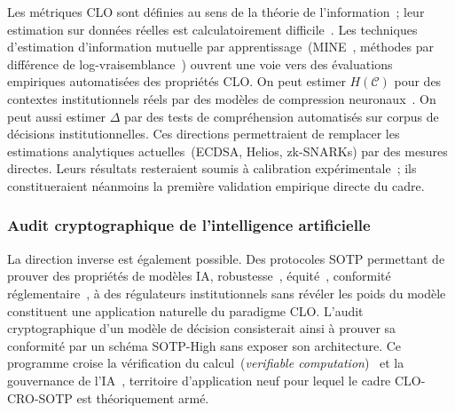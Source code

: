 \begin{sloppypar}
Les m\'etriques CLO sont d\'efinies au sens de la th\'eorie de
l'information~\cite{Shannon48,CoverThomas06}; leur estimation sur donn\'ees
r\'eelles est calculatoirement difficile~\cite{Paninski2003}. Les
techniques d'estimation d'information mutuelle par apprentissage~(MINE~\cite{Belghazi18},
m\'ethodes par diff\'erence de log-vraisemblance~\cite{Poole2019,Oord2018})
ouvrent une voie vers des \'evaluations empiriques automatis\'ees des
propri\'et\'es CLO. On peut estimer $H(\mathcal{C})$ pour des contextes
institutionnels r\'eels par des mod\`eles de compression
neuronaux~\cite{Hinton2007,Kingma2013}. On peut aussi estimer $\Delta$ par des tests
de compr\'ehension automatis\'es sur corpus de d\'ecisions institutionnelles.
Ces directions permettraient de remplacer les estimations analytiques
actuelles~(ECDSA, Helios, zk-SNARKs) par des mesures directes. Leurs
r\'esultats resteraient soumis \`a calibration
exp\'erimentale~\cite{Campbell1976,Saltelli2008}; ils constitueraient
n\'eanmoins la premi\`ere validation empirique directe du cadre.

\subsubsection{Audit cryptographique de l'intelligence artificielle}
\label{subsubsec:audit_ia}

La direction inverse est \'egalement possible. Des protocoles SOTP permettant
de prouver des propri\'et\'es de mod\`eles IA,
robustesse~\cite{Goodfellow2015,Madry2018},
\'equit\'e~\cite{Barocas2019,Mitchell2021}, conformit\'e
r\'eglementaire~\cite{EU2024AI,EU2021AI}, \`a des r\'egulateurs
institutionnels sans r\'ev\'eler les poids du mod\`ele constituent une
application naturelle du paradigme CLO. L'audit cryptographique d'un mod\`ele
de d\'ecision consisterait ainsi \`a prouver sa conformit\'e par un sch\'ema SOTP-High sans exposer
son architecture. Ce programme croise la v\'erification du
calcul~(\textit{verifiable computation})~\cite{Gennaro2010,Walfish2015} et la
gouvernance de l'IA~\cite{Floridi2018,Jobin2019}, territoire d'application
neuf pour lequel le cadre CLO-CRO-SOTP est th\'eoriquement arm\'e.
\end{sloppypar}

